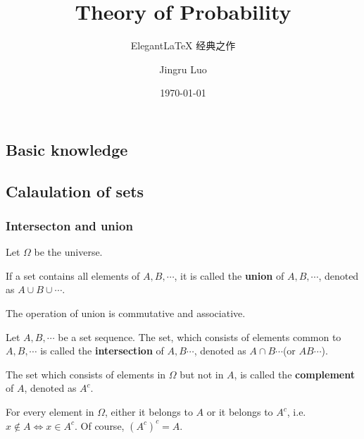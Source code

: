 \documentclass[11pt,singlecolumn, openany, citestyle=authoryear]{elegantbook}
\title{Theory of Probability}
\subtitle{Elegant\LaTeX{} 经典之作}
\author{Jingru Luo}
\institute{New York University Shanghai}
\date{\today}
\begin{document}
\begin{CJK}{UTF8}{gbsn}
    \maketitle
    \frontmatter
    
    
    \tableofcontents
    
    \mainmatter

    \chapter{Basic knowledge}
    \section{Calaulation of sets}\label{sec:CalaulationOfSets}
    \subsection{Intersecton and union}
    Let $\Omega$ be the universe.
    \begin{definition}
        If a set contains all elements of $A,B,\cdots$, it is called the 
        \textbf{union} of $A,B,\cdots$, denoted as 
        $A\cup B \cup \cdots.$
    \end{definition}
    The operation of union is commutative and associative.
    
    \begin{definition}
        Let $A,B,\cdots$ be a set sequence. 
        The set, which consists of elements common to $A,B,\cdots$
        is called the \textbf{intersection} of $A,B\cdots$, denoted as 
        $A \cap B \cdots$(or $AB\cdots$).
    \end{definition}
    
    \begin{definition}
        The set which consists of elements in $\Omega$ but not in $A$, is called
        the \textbf{complement} of $A$, denoted as $A^c$. 
    \end{definition}
    
    For every element in $\Omega$, either it belongs to $A$ or it belongs to 
    $A^c$, i.e. $x \notin A \iff x \in A^c$. Of course, $(A^c)^c = A$.
    

\end{CJK}
\end{document}
